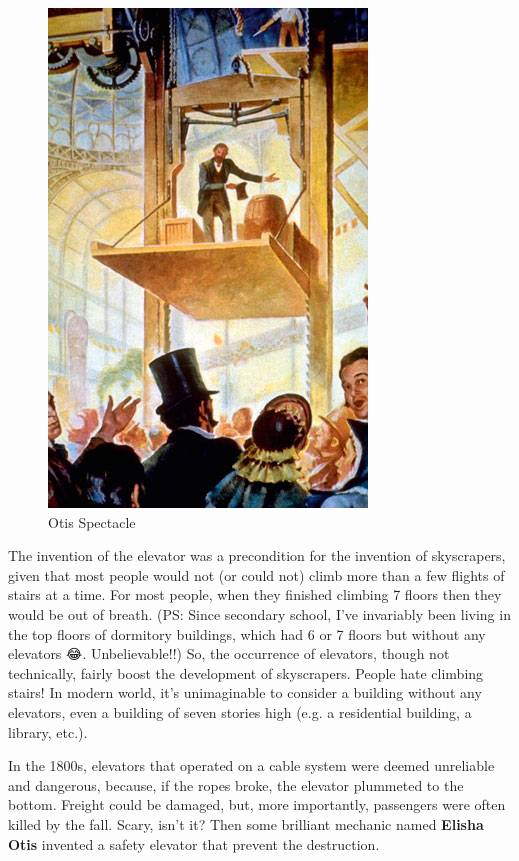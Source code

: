     \begin{figure}
    	\begin{center}    		
    		\includegraphics[scale=0.5]{img/Otis_Safety_Elevator}
    	\end{center}
    	\caption*{Otis Spectacle}
    	\label{Otis_spectacle}
    \end{figure}  
	The invention of the elevator was a precondition for the invention of 
	skyscrapers, given that most people would not (or could not) climb more 
	than a few flights of stairs at a time. For most people, when they 
	finished climbing 7 floors
	then they would be out of breath. (PS: Since secondary school, I've 
	invariably been living 
	in the top floors of dormitory buildings, which had 6 or 7 floors but 
	without any elevators 😂. Unbelievable!!) So, the occurrence of  
	elevators, though not technically, fairly boost the development of  
	skyscrapers. People hate climbing stairs! In modern world, it's  
	unimaginable to consider a building without any elevators, even a 
	building of seven stories high (e.g. a residential building, 
	a library, etc.). 
	
	In the 1800s, elevators that operated on a cable system were deemed 
	unreliable and dangerous, because, if the ropes broke, the elevator 
	plummeted to the bottom. Freight could be damaged, but, more importantly, 
	passengers were often killed by the fall. Scary, isn't it? Then some 
	brilliant mechanic named \textbf{Elisha Otis} invented a safety elevator 
	that 
	prevent the destruction.
	
